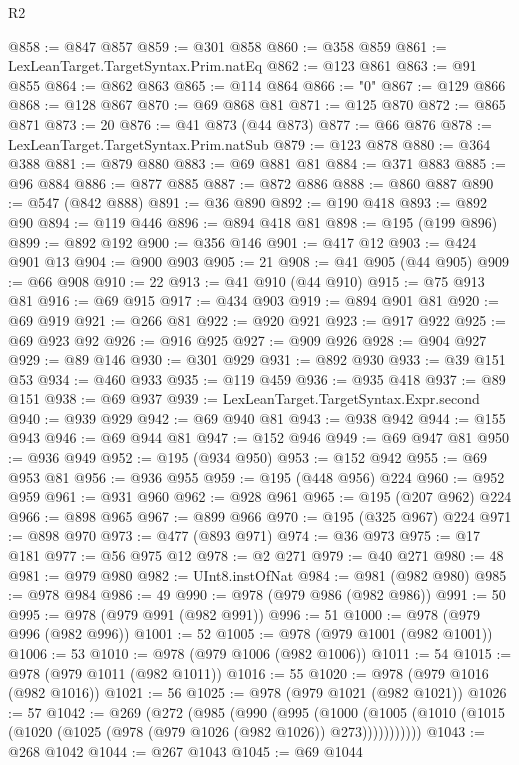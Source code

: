 \begin{lexlean}{R2}
\begin{coremodule}
@858 := @847 @857
@859 := @301 @858
@860 := @358 @859
@861 := LexLeanTarget.TargetSyntax.Prim.natEq
@862 := @123 @861
@863 := @91 @855
@864 := @862 @863
@865 := @114 @864
@866 := "0"
@867 := @129 @866
@868 := @128 @867
@870 := @69 @868 @81
@871 := @125 @870
@872 := @865 @871
@873 := 20
@876 := @41 @873 (@44 @873)
@877 := @66 @876
@878 := LexLeanTarget.TargetSyntax.Prim.natSub
@879 := @123 @878
@880 := @364 @388
@881 := @879 @880
@883 := @69 @881 @81
@884 := @371 @883
@885 := @96 @884
@886 := @877 @885
@887 := @872 @886
@888 := @860 @887
@890 := @547 (@842 @888)
@891 := @36 @890
@892 := @190 @418
@893 := @892 @90
@894 := @119 @446
@896 := @894 @418 @81
@898 := @195 (@199 @896)
@899 := @892 @192
@900 := @356 @146
@901 := @417 @12
@903 := @424 @901 @13
@904 := @900 @903
@905 := 21
@908 := @41 @905 (@44 @905)
@909 := @66 @908
@910 := 22
@913 := @41 @910 (@44 @910)
@915 := @75 @913 @81
@916 := @69 @915
@917 := @434 @903
@919 := @894 @901 @81
@920 := @69 @919
@921 := @266 @81
@922 := @920 @921
@923 := @917 @922
@925 := @69 @923 @92
@926 := @916 @925
@927 := @909 @926
@928 := @904 @927
@929 := @89 @146
@930 := @301 @929
@931 := @892 @930
@933 := @39 @151 @53
@934 := @460 @933
@935 := @119 @459
@936 := @935 @418
@937 := @89 @151
@938 := @69 @937
@939 := LexLeanTarget.TargetSyntax.Expr.second
@940 := @939 @929
@942 := @69 @940 @81
@943 := @938 @942
@944 := @155 @943
@946 := @69 @944 @81
@947 := @152 @946
@949 := @69 @947 @81
@950 := @936 @949
@952 := @195 (@934 @950)
@953 := @152 @942
@955 := @69 @953 @81
@956 := @936 @955
@959 := @195 (@448 @956) @224
@960 := @952 @959
@961 := @931 @960
@962 := @928 @961
@965 := @195 (@207 @962) @224
@966 := @898 @965
@967 := @899 @966
@970 := @195 (@325 @967) @224
@971 := @898 @970
@973 := @477 (@893 @971)
@974 := @36 @973
@975 := @17 @181
@977 := @56 @975 @12
@978 := @2 @271
@979 := @40 @271
@980 := 48
@981 := @979 @980
@982 := UInt8.instOfNat
@984 := @981 (@982 @980)
@985 := @978 @984
@986 := 49
@990 := @978 (@979 @986 (@982 @986))
@991 := 50
@995 := @978 (@979 @991 (@982 @991))
@996 := 51
@1000 := @978 (@979 @996 (@982 @996))
@1001 := 52
@1005 := @978 (@979 @1001 (@982 @1001))
@1006 := 53
@1010 := @978 (@979 @1006 (@982 @1006))
@1011 := 54
@1015 := @978 (@979 @1011 (@982 @1011))
@1016 := 55
@1020 := @978 (@979 @1016 (@982 @1016))
@1021 := 56
@1025 := @978 (@979 @1021 (@982 @1021))
@1026 := 57
@1042 := @269
    (@272
      (@985
        (@990
          (@995
            (@1000
              (@1005 (@1010 (@1015 (@1020 (@1025 (@978 (@979 @1026 (@982 @1026)) @273)))))))))))
@1043 := @268 @1042
@1044 := @267 @1043
@1045 := @69 @1044

\end{coremodule}
\end{lexlean}
